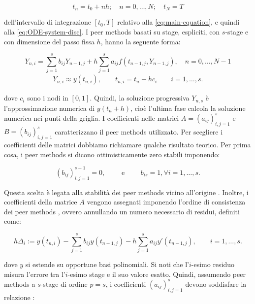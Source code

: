 \begin{equation}
    t_n = t_0 + nh; \quad n = 0, \ldots, N; \quad t_N = T 
\end{equation}

\noindent dell'intervallo di integrazione $[t_0,T]$ relativo alla \eqref{eq:main-equation}, e quindi alla \eqref{eq:ODE-system-disc}. I peer methods basati su stage, espliciti, con $s$-stage e con dimensione del passo fissa $h$, hanno la seguente forma:

\begin{equation}
    Y_{n, i} = \sum_{j = 1}^s b_{ij}Y_{n - 1, j} + h\sum_{j = 1}^s a_{ij} f(t_{n - 1, j}, Y_{n - 1, j}), \quad n = 0,\ldots, N - 1
    \label{eq:peer-methods-1}
\end{equation}
\begin{gather*}
    Y_{n, i} \approx y(t_{n, i}), \qquad t_{n, i} = t_n + hc_i \qquad i = 1, \ldots, s.
\end{gather*}

\noindent dove $c_i$ sono i nodi in $[0, 1]$. Quindi, la soluzione progressiva $Y_{n,s}$ è l'approssimazione numerica di $y(t_n +h)$, cioè l'ultima fase calcola la soluzione numerica nei punti della griglia. I coefficienti nelle matrici $A = (a_{ij})^s _{i,j=1}$ e $B = (b_{ij})^s_{i,j=1}$ caratterizzano il peer methods utilizzato. Per scegliere i coefficienti delle matrici dobbiamo richiamare qualche risultato teorico. Per prima cosa, i peer methods si dicono ottimisticamente zero stabili imponendo:

\begin{equation*}
    (b_{ij})^{s-1}_{i,j=1} = 0, \qquad \text{ e } \qquad b_{is} = 1, \forall i = 1, \ldots, s.
\end{equation*}

\noindent Questa scelta è legata alla stabilità dei peer methods vicino all'origine \cite{two-step-peer-methods}. Inoltre, i coefficienti della matrice $A$ vengono assegnati imponendo l'ordine di consistenza dei peer methods \cite{two-step-peer-methods}, ovvero annullando un numero necessario di residui, definiti come:

\begin{equation*}
    h\Delta_i := y(t_{n,i}) - \sum_{j = 1}^{s}b_{ij}y(t_{n-1,j}) - h\sum_{j = 1}^{s}a_{ij}y'(t_{n-1,j}), \qquad i = 1,\ldots,s.
\end{equation*}

\noindent dove $y$ si estende su opportune basi polinomiali. Si noti che l'$i$-esimo residuo misura l'errore tra l'$i$-esimo stage e il suo valore esatto. Quindi, assumendo peer methods a $s$-stage di ordine $p = s$, i coefficienti $(a_{ij})^s_{i,j=1}$ devono soddisfare la relazione \cite{two-step-peer-methods}:

